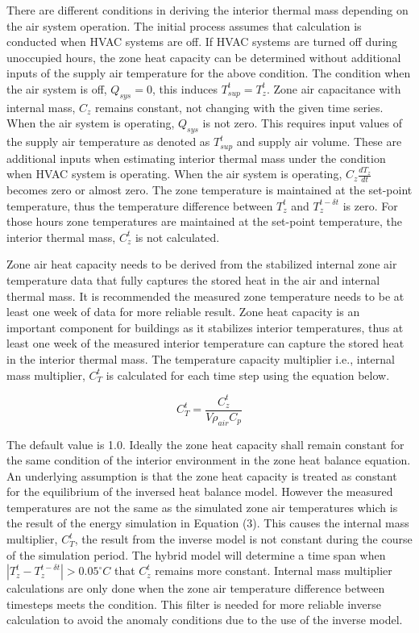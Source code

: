 There are different conditions in deriving the interior thermal mass depending on the air system operation. The initial process assumes that calculation is conducted when HVAC systems are off. If HVAC systems are turned off during unoccupied hours, the zone heat capacity can be determined without additional inputs of the supply air temperature for the above condition. The condition when the air system is off, $Q_{sys}=0$, this induces $T_{sup}^t=T_z^t$.  Zone air capacitance with internal mass, $C_z$  remains constant, not changing with the given time series. When the air system is operating, $Q_{sys}$ is not zero. This requires input values of the supply air temperature as denoted as $T_{sup}^t$ and supply air volume. These are additional inputs when estimating interior thermal mass under the condition when HVAC system is operating. When the air system is operating, $C_z \frac {dT_z} {dt}$ becomes zero or almost zero. The zone temperature is maintained at the set-point temperature, thus the temperature difference between $T_z^t$  and $T_z^{t-\delta t}$ is zero. For those hours zone temperatures are maintained at the set-point temperature, the interior thermal mass, $C_z^t$ is not calculated. 

Zone air heat capacity needs to be derived from the stabilized internal zone air temperature data that fully captures the stored heat in the air and internal thermal mass. It is recommended the measured zone temperature needs to be at least one week of data for more reliable result. Zone heat capacity is an important component for buildings as it stabilizes interior temperatures, thus at least one week of the measured interior temperature can capture the stored heat in the interior thermal mass. The temperature capacity multiplier i.e., internal mass multiplier, $C_T^t$ is calculated for each time step using the equation below.


\begin{equation}
C_T^t = \frac{C_z^t} {V\rho_{air} C_p}
\end{equation}

The default value is 1.0. Ideally the zone heat capacity shall remain constant for the same condition of the interior environment in the zone heat balance equation. An underlying assumption is that the zone heat capacity is treated as constant for the equilibrium of the inversed heat balance model. However the measured temperatures are not the same as the simulated zone air temperatures which is the result of the energy simulation in Equation (3). This causes the internal mass multiplier, $C_T^t$, the result from the inverse model is not constant during the course of the simulation period. The hybrid model will determine a time span when $|T_z^t - T_z^{t-\delta t}| > 0.05^{\circ}C$ that $C_z^t$ remains more constant. Internal mass multiplier calculations are only done when the zone air temperature difference between timesteps meets the condition. This filter is needed for more reliable inverse calculation to avoid the anomaly conditions due to the use of the inverse model.  

